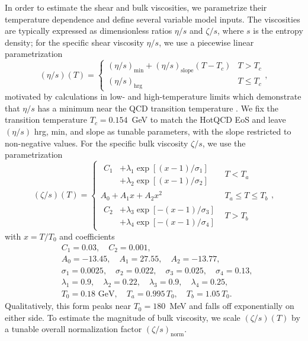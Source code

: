 \documentclass[aps,prc,reprint,amsmath,nofootinbib]{revtex4-1}
\begin{document}
In order to estimate the shear and bulk viscosities, we parametrize their temperature dependence and define several variable model inputs.
The viscosities are typically expressed as dimensionless ratios $\eta/s$ and $\zeta/s$, where $s$ is the entropy density;
for the specific shear viscosity $\eta/s$, we use a piecewise linear parametrization
\begin{equation}
  (\eta/s)(T) =
  \begin{cases}
    (\eta/s)_\text{min} + (\eta/s)_\text{slope} (T - T_c) & T > T_c \\
    (\eta/s)_\text{hrg}                                   & T \le T_c
  \end{cases},
  \label{eq:etas}
\end{equation}
motivated by calculations in low- and high-temperature limits which demonstrate that $\eta/s$ has a minimum near the QCD transition temperature \cite{Prakash:1993bt, Arnold:2003zc, Csernai:2006zz}.
We fix the transition temperature $T_c = 0.154$~GeV to match the HotQCD EoS \cite{Bazavov:2014pvz} and leave $(\eta/s)$ hrg, min, and slope as tunable parameters, with the slope restricted to non-negative values.
For the specific bulk viscosity $\zeta/s$, we use the parametrization \cite{Denicol:2009am, Ryu:2015vwa}
\begin{equation}
  (\zeta/s)(T) =
  \begin{cases}
    \begin{aligned}
      C_1 &+ \lambda_1 \exp [(x-1)/\sigma_1]  \\ &+ \lambda_2 \exp [ (x-1)/\sigma_2]
    \end{aligned}
    &T < T_a \\[3ex]
    A_0 + A_1 x + A_2 x^2 &T_a \le T \le T_b \\[2ex]
    \begin{aligned}
      C_2 &+ \lambda_3 \exp [-(x-1)/\sigma_3]  \\ &+ \lambda_4 \exp [-(x-1)/\sigma_4]
    \end{aligned}
    &T > T_b
  \end{cases},
  \label{eq:zetas}
\end{equation}
with $x = T/T_0$ and coefficients
\begin{align*}
  &C_1=0.03,\quad C_2=0.001, \\
  &A_0=-13.45,\quad A_1=27.55,\quad A_2=-13.77, \\
  &\sigma_1=0.0025,\quad \sigma_2=0.022,\quad \sigma_3=0.025,\quad \sigma_4=0.13, \\
  &\lambda_1=0.9,\quad \lambda_2=0.22,\quad \lambda_3=0.9,\quad \lambda_4=0.25, \\
  &T_0 = 0.18 \text{ GeV},\quad T_a = 0.995\, T_0,\quad T_b = 1.05\, T_0.
\end{align*}
Qualitatively, this form peaks near $T_0 = 180$~MeV and falls off exponentially on either side.
To estimate the magnitude of bulk viscosity, we scale $(\zeta/s)(T)$ by a tunable overall normalization factor $(\zeta/s)_\text{norm}$.
\end{document}
